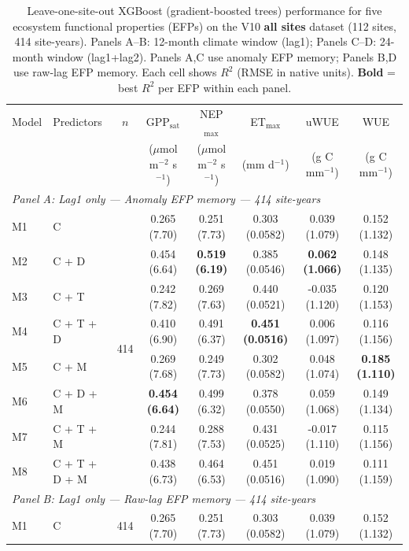 \begin{table}[htbp]
\centering
\caption{Leave-one-site-out XGBoost (gradient-boosted trees) performance for five ecosystem functional properties (EFPs) on the V10 \textbf{all sites} dataset (112 sites, 414 site-years). Panels A--B: 12-month climate window (lag1); Panels C--D: 24-month window (lag1+lag2). Panels A,C use anomaly EFP memory; Panels B,D use raw-lag EFP memory. Each cell shows $R^2$ (RMSE in native units). \textbf{Bold} = best $R^2$ per EFP within each panel.}
\label{tab:XGB_LOSO_v10_all_sites}
\footnotesize
\setlength{\tabcolsep}{4pt}
\begin{tabular}{llcccccc}
\toprule
Model & Predictors & $n$ & GPP$_\mathrm{sat}$ & NEP$_\mathrm{max}$ & ET$_\mathrm{max}$ & uWUE & WUE \\
  &  &  & ($\mu$mol m$^{-2}$ s$^{-1}$) & ($\mu$mol m$^{-2}$ s$^{-1}$) & (mm d$^{-1}$) & (g C mm$^{-1}$) & (g C mm$^{-1}$) \\
\midrule
\multicolumn{8}{l}{\textit{Panel A: Lag1 only --- Anomaly EFP memory --- 414 site-years}} \\
\midrule
M1 & C & \multirow{8}{*}{414} & 0.265 (7.70) & 0.251 (7.73) & 0.303 (0.0582) & 0.039 (1.079) & 0.152 (1.132) \\
M2 & C + D &  & 0.454 (6.64) & \textbf{0.519 (6.19)} & 0.385 (0.0546) & \textbf{0.062 (1.066)} & 0.148 (1.135) \\
M3 & C + T &  & 0.242 (7.82) & 0.269 (7.63) & 0.440 (0.0521) & -0.035 (1.120) & 0.120 (1.153) \\
M4 & C + T + D &  & 0.410 (6.90) & 0.491 (6.37) & \textbf{0.451 (0.0516)} & 0.006 (1.097) & 0.116 (1.156) \\
M5 & C + M &  & 0.269 (7.68) & 0.249 (7.73) & 0.302 (0.0582) & 0.048 (1.074) & \textbf{0.185 (1.110)} \\
M6 & C + D + M &  & \textbf{0.454 (6.64)} & 0.499 (6.32) & 0.378 (0.0550) & 0.059 (1.068) & 0.149 (1.134) \\
M7 & C + T + M &  & 0.244 (7.81) & 0.288 (7.53) & 0.431 (0.0525) & -0.017 (1.110) & 0.115 (1.156) \\
M8 & C + T + D + M &  & 0.438 (6.73) & 0.464 (6.53) & 0.451 (0.0516) & 0.019 (1.090) & 0.111 (1.159) \\
\midrule
\multicolumn{8}{l}{\textit{Panel B: Lag1 only --- Raw-lag EFP memory --- 414 site-years}} \\
\midrule
M1 & C & \multirow{8}{*}{414} & 0.265 (7.70) & 0.251 (7.73) & 0.303 (0.0582) & 0.039 (1.079) & 0.152 (1.132) \\

\end{tabular}
\end{table}
